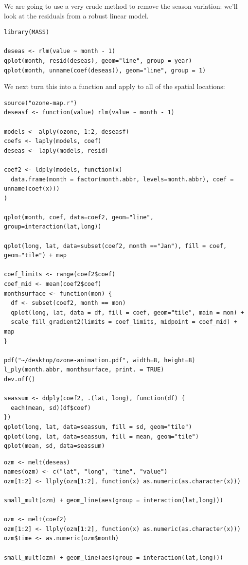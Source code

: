 \documentclass[letterpage]{scrartcl}
\begin{document}
We are going to use a very crude method to remove the season variation: we'll look at the residuals from a robust linear model.

\begin{verbatim}
library(MASS)

deseas <- rlm(value ~ month - 1)
qplot(month, resid(deseas), geom="line", group = year)
qplot(month, unname(coef(deseas)), geom="line", group = 1)

\end{verbatim}

We next turn this into a function and apply to all of the spatial locations:

\begin{verbatim}
source("ozone-map.r")
deseasf <- function(value) rlm(value ~ month - 1)

models <- alply(ozone, 1:2, deseasf)
coefs <- laply(models, coef)
deseas <- laply(models, resid)

coef2 <- ldply(models, function(x) 
  data.frame(month = factor(month.abbr, levels=month.abbr), coef = unname(coef(x)))
)

qplot(month, coef, data=coef2, geom="line", group=interaction(lat,long))

qplot(long, lat, data=subset(coef2, month =="Jan"), fill = coef, geom="tile") + map

coef_limits <- range(coef2$coef)
coef_mid <- mean(coef2$coef)
monthsurface <- function(mon) {
  df <- subset(coef2, month == mon)
  qplot(long, lat, data = df, fill = coef, geom="tile", main = mon) + 
  scale_fill_gradient2(limits = coef_limits, midpoint = coef_mid) + map
}

pdf("~/desktop/ozone-animation.pdf", width=8, height=8)
l_ply(month.abbr, monthsurface, print. = TRUE)
dev.off()

seassum <- ddply(coef2, .(lat, long), function(df) {
  each(mean, sd)(df$coef)
})
qplot(long, lat, data=seassum, fill = sd, geom="tile")
qplot(long, lat, data=seassum, fill = mean, geom="tile")
qplot(mean, sd, data=seassum)
\end{verbatim}

\begin{verbatim}
ozm <- melt(deseas)
names(ozm) <- c("lat", "long", "time", "value")
ozm[1:2] <- llply(ozm[1:2], function(x) as.numeric(as.character(x)))

small_mult(ozm) + geom_line(aes(group = interaction(lat,long)))

ozm <- melt(coef2)
ozm[1:2] <- llply(ozm[1:2], function(x) as.numeric(as.character(x)))
ozm$time <- as.numeric(ozm$month)

small_mult(ozm) + geom_line(aes(group = interaction(lat,long)))

\end{verbatim}
\end{document}
